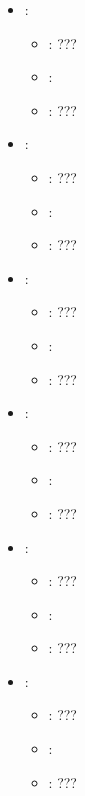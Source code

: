 \begin{itemize}
    \item {}:
           \begin{itemize}
                \item \optionPossibleValues{}: ???
                \item \optionDefaultValue{}: 
                \item \optionDescrption{}: ???
           \end{itemize}
    \item {}:
           \begin{itemize}
                \item \optionPossibleValues{}: ???
                \item \optionDefaultValue{}: 
                \item \optionDescrption{}: ???
           \end{itemize}
    \item {}:
           \begin{itemize}
                \item \optionPossibleValues{}: ???
                \item \optionDefaultValue{}: 
                \item \optionDescrption{}: ???
           \end{itemize}
    \item {}:
           \begin{itemize}
                \item \optionPossibleValues{}: ???
                \item \optionDefaultValue{}: 
                \item \optionDescrption{}: ???
           \end{itemize}
    \item {}:
           \begin{itemize}
                \item \optionPossibleValues{}: ???
                \item \optionDefaultValue{}: 
                \item \optionDescrption{}: ???
           \end{itemize}
    \item {}:
           \begin{itemize}
                \item \optionPossibleValues{}: ???
                \item \optionDefaultValue{}: 
                \item \optionDescrption{}: ???
           \end{itemize}
\end{itemize}


